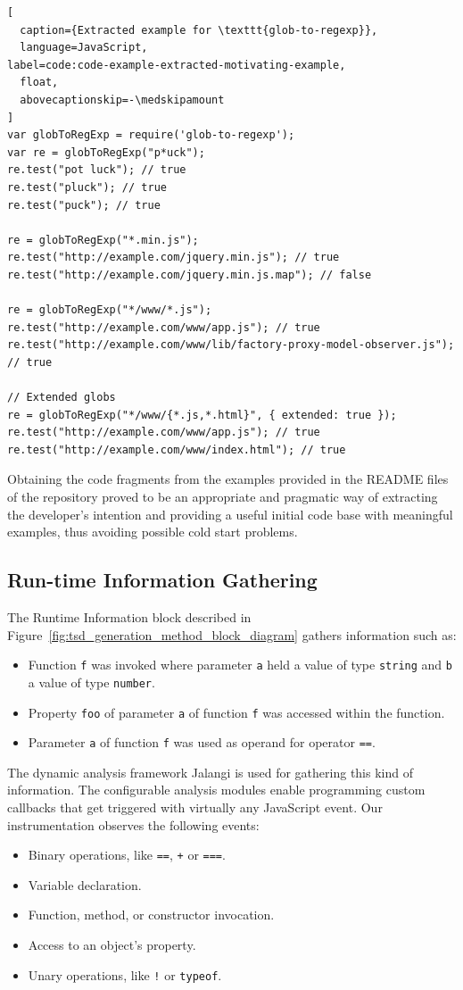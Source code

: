 \documentclass[english,cleveref,autoref,submission]{programming}
\newcommand{\figref}[1]{Figure~\ref{#1}}
\begin{document}
\begin{lstlisting}[
  caption={Extracted example for \texttt{glob-to-regexp}},
  language=JavaScript,
label=code:code-example-extracted-motivating-example,
  float,
  abovecaptionskip=-\medskipamount
]
var globToRegExp = require('glob-to-regexp');
var re = globToRegExp("p*uck");
re.test("pot luck"); // true
re.test("pluck"); // true
re.test("puck"); // true

re = globToRegExp("*.min.js");
re.test("http://example.com/jquery.min.js"); // true
re.test("http://example.com/jquery.min.js.map"); // false

re = globToRegExp("*/www/*.js");
re.test("http://example.com/www/app.js"); // true
re.test("http://example.com/www/lib/factory-proxy-model-observer.js"); // true

// Extended globs
re = globToRegExp("*/www/{*.js,*.html}", { extended: true });
re.test("http://example.com/www/app.js"); // true
re.test("http://example.com/www/index.html"); // true
\end{lstlisting}

Obtaining the code fragments from the examples provided in the
README files of the repository proved to be an
appropriate and pragmatic way of extracting the developer's
intention and providing a useful initial code base with meaningful
examples, thus avoiding possible cold start problems.

\subsection{Run-time Information Gathering}
The Runtime Information block described in
\figref{fig:tsd_generation_method_block_diagram} gathers
information such as: 

\begin{itemize}
  \item Function \lstinline{f} was invoked where parameter
    \lstinline{a} held a value of type \lstinline{string} and
    \lstinline{b} a value of type \lstinline{number}. 
  \item Property \lstinline{foo} of parameter \lstinline{a} of
    function \lstinline{f} was accessed within the function. 
  \item Parameter \lstinline{a} of function \lstinline{f} was used as
    operand for operator \lstinline{==}. 
\end{itemize}

The dynamic analysis framework Jalangi is used for gathering this kind of
information. The configurable analysis modules enable
programming custom callbacks that get triggered with virtually any
JavaScript event. Our instrumentation observes the following events: 
\begin{itemize}
  \item Binary operations, like \lstinline{==}, \lstinline{+} or
    \lstinline{===}.  
  \item Variable declaration.
  \item Function, method, or constructor invocation.
  \item Access to an object's property.
  \item Unary operations, like \lstinline{!} or \lstinline{typeof}.
\end{itemize}
\end{document}
